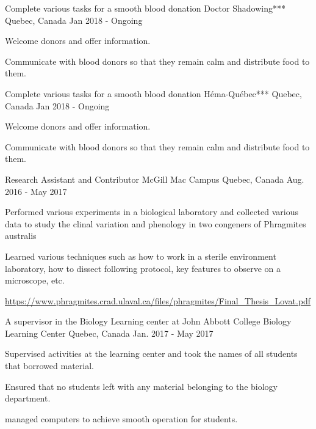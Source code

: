 
\begin{cventries}
\cventry
    {Complete various tasks for a smooth blood donation}
    {Doctor Shadowing***}
    {Quebec, Canada}
    {Jan 2018 - Ongoing}
    {
      \begin{cvitems}
        \item {Welcome donors and offer information.}
        \item {Communicate with blood donors so that they remain calm and distribute food to them.}
      \end{cvitems}
    }
\cventry
    {Complete various tasks for a smooth blood donation}
    {Héma-Québec***}
    {Quebec, Canada}
    {Jan 2018 - Ongoing}
    {
      \begin{cvitems}
        \item {Welcome donors and offer information.}
        \item {Communicate with blood donors so that they remain calm and distribute food to them.}
      \end{cvitems}
    }
    \cventry
    {Research Assistant
and Contributor}
    {McGill Mac Campus}
    {Quebec, Canada}
    {Aug. 2016 - May 2017}
    {
      \begin{cvitems}
        \item {Performed various experiments in a biological laboratory and collected various data to study the clinal variation and phenology in two congeners of Phragmites australis}
        \item {Learned various techniques such as how to work in a sterile environment laboratory, how to dissect following protocol, key features to observe on a microscope, etc. }
        \item{\url{https://www.phragmites.crad.ulaval.ca/files/phragmites/Final_Thesis_Lovat.pdf}}
      \end{cvitems}
    }
  \cventry
    {A supervisor in the Biology Learning center at John Abbott College}
    {Biology Learning Center}
    {Quebec, Canada}
    {Jan. 2017 - May 2017}
    {
      \begin{cvitems}
        \item {Supervised activities at the learning center and took the names of all students that borrowed material.}
        \item {Ensured that no students left with any material belonging to the biology department.}
        \item {managed computers to achieve smooth operation for students.}

\end{cvitems}}
\end{cventries}
